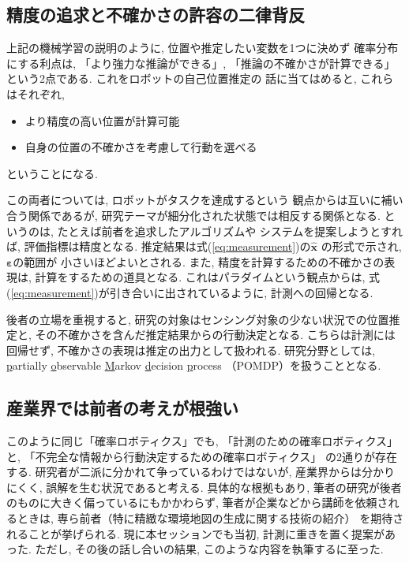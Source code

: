\documentclass[twocolumn]{jarticle} %
\newcommand{\V}[1]{\boldsymbol{#1}}
\begin{document}
\subsection{精度の追求と不確かさの許容の二律背反}

上記の機械学習の説明のように, 
位置や推定したい変数を1つに決めず
確率分布にする利点は, 
「より強力な推論ができる」, 
「推論の不確かさが計算できる」
という2点である. これをロボットの自己位置推定の
話に当てはめると, これらはそれぞれ, 
\begin{itemize}
	\item より精度の高い位置が計算可能
	\item 自身の位置の不確かさを考慮して行動を選べる
\end{itemize}
ということになる. 

この両者については, ロボットがタスクを達成するという
観点からは互いに補い合う関係であるが, 
研究テーマが細分化された状態では相反する関係となる. 
というのは, たとえば前者を追求したアルゴリズムや
システムを提案しようとすれば, 
評価指標は精度となる. 
推定結果は式(\ref{eq:measurement})の$\hat{\V{x}}$
の形式で示され, $\V{\varepsilon}$の範囲が
小さいほどよいとされる. 
また, 精度を計算するための不確かさの表現は, 
計算をするための道具となる. 
これはパラダイムという観点からは, 
式(\ref{eq:measurement})が引き合いに出されているように, 
計測への回帰となる. 


後者の立場を重視すると, 
研究の対象はセンシング対象の少ない状況での位置推定と, 
その不確かさを含んだ推定結果からの行動決定となる\cite{上田2007,ueda2015}. 
こちらは計測には回帰せず, 
不確かさの表現は推定の出力として扱われる. 
研究分野としては, \underline{p}artially \underline{o}bservable
\underline{M}arkov \underline{d}ecision \underline{p}rocess
（POMDP）\cite{kaelbling1998}を扱うこととなる. 



\subsection{産業界では前者の考えが根強い}

このように同じ「確率ロボティクス」でも, 
「計測のための確率ロボティクス」と, 
「不完全な情報から行動決定するための確率ロボティクス」
の2通りが存在する. 
研究者が二派に分かれて争っているわけではないが, 
産業界からは分かりにくく, 誤解を生む状況であると考える. 
具体的な根拠もあり, 
筆者の研究が後者のものに大きく偏っているにもかかわらず, 
筆者が企業などから講師を依頼されるときは, 
専ら前者（特に精緻な環境地図の生成に関する技術の紹介）
を期待されることが挙げられる. 
現に本セッションでも当初, 計測に重きを置く提案があった. 
ただし, その後の話し合いの結果, このような内容を執筆するに至った. 
\end{document}
